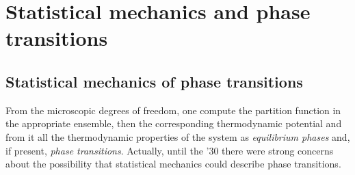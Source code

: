 \documentclass[../../Main/Main.tex]{subfiles}
\begin{document}
\chapter{Statistical mechanics and phase transitions}

\section{Statistical mechanics of phase transitions}

From the microscopic degrees of freedom, one compute the partition function in the appropriate ensemble, then the corresponding thermodynamic potential and from it all the thermodynamic properties of the system as \emph{equilibrium phases} and, if present, \emph{phase transitions}. Actually, until the '30 there were strong concerns about the possibility that statistical mechanics could describe phase transitions.

\begin{figure}[h!]
\begin{minipage}[c]{0.5\linewidth}
\centering
{}
\end{minipage}
\begin{minipage}[]{0.5\linewidth}
\centering
{}
\end{minipage}
\caption{\label{fig:} }
\end{figure}
\end{document}

